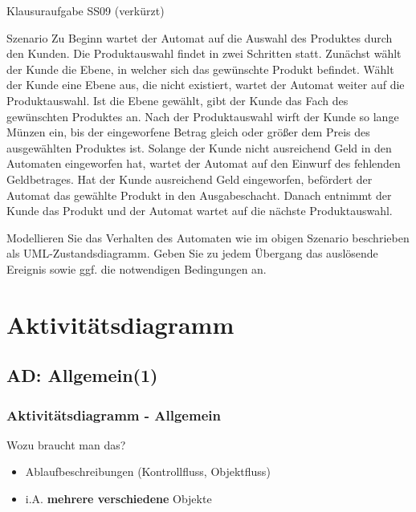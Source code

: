 \documentclass[18pt]{beamer}
\begin{document}
	\begin{frame}{Klausuraufgabe SS09 (verkürzt)}
	\begin{block}{Szenario}
	\small	Zu Beginn wartet der Automat auf die Auswahl des Produktes durch den Kunden. Die
		Produktauswahl findet in zwei Schritten statt. Zunächst wählt der Kunde die Ebene, in
		welcher sich das gewünschte Produkt befindet. Wählt der Kunde eine Ebene aus, die
		nicht existiert, wartet der Automat weiter auf die Produktauswahl. Ist die Ebene gewählt,
		gibt der Kunde das Fach des gewünschten Produktes an. Nach der Produktauswahl wirft der Kunde so lange
		Münzen ein, bis der eingeworfene Betrag gleich oder größer dem Preis des ausgewählten
		Produktes ist. Solange der Kunde nicht ausreichend Geld in den Automaten eingeworfen
		hat, wartet der Automat auf den Einwurf des fehlenden Geldbetrages. Hat der
		Kunde ausreichend Geld eingeworfen, befördert der Automat das gewählte Produkt in
		den Ausgabeschacht. Danach entnimmt der Kunde das Produkt und der Automat wartet auf die nächste Produktauswahl.
	\end{block}
		Modellieren Sie das Verhalten des Automaten wie im obigen Szenario beschrieben als UML-Zustandsdiagramm.
		Geben Sie zu jedem Übergang das auslösende Ereignis sowie ggf. die
		notwendigen Bedingungen an.
\end{frame}
		
\section{Aktivitätsdiagramm}
	\subsection{AD: Allgemein(1)}
	\begin{frame}
		\frametitle{Aktivitätsdiagramm - Allgemein}
		\begin{block}{Wozu braucht man das?}
			\pause
			\begin{itemize}
				\item Ablaufbeschreibungen (Kontrollfluss, Objektfluss)
				\item i.A. \textbf{mehrere verschiedene} Objekte
			\end{itemize}
		\end{block}
	\end{frame}
\end{document}
